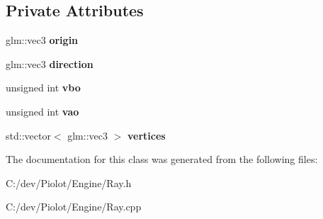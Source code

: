 \subsection*{Private Attributes}
\begin{DoxyCompactItemize}
\item 
\mbox{\label{classpiolot_1_1_ray_a0db15f5545f46a7cf172a6cd8010e7c4}} 
glm\+::vec3 {\bfseries origin}
\item 
\mbox{\label{classpiolot_1_1_ray_aaef1fc006491be8684d1786d2584b5fb}} 
glm\+::vec3 {\bfseries direction}
\item 
\mbox{\label{classpiolot_1_1_ray_a92517c7821a901e1b9c883f6635472cb}} 
unsigned int {\bfseries vbo}
\item 
\mbox{\label{classpiolot_1_1_ray_a2b5e91b97506c618aef3b26c463f9788}} 
unsigned int {\bfseries vao}
\item 
\mbox{\label{classpiolot_1_1_ray_adb40c4fbcb029550c160a892842c40cc}} 
std\+::vector$<$ glm\+::vec3 $>$ {\bfseries vertices}
\end{DoxyCompactItemize}


The documentation for this class was generated from the following files\+:\begin{DoxyCompactItemize}
\item 
C\+:/dev/\+Piolot/\+Engine/Ray.\+h\item 
C\+:/dev/\+Piolot/\+Engine/Ray.\+cpp\end{DoxyCompactItemize}
